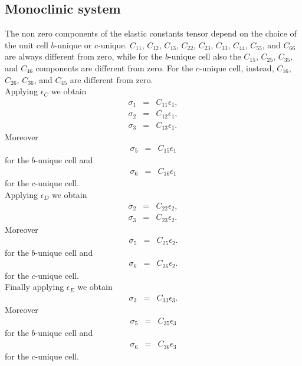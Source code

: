 \documentclass[12pt,a4paper]{article}
\begin{document}
\subsection{\color{web-blue}Monoclinic system}
The non zero components of the elastic constants tensor depend on the choice
of the unit cell $b$-unique or $c$-unique. 
$C_{11}$, $C_{12}$, $C_{13}$, $C_{22}$, $C_{23}$, $C_{33}$, $C_{44}$, 
$C_{55}$, and $C_{66}$ are always different from zero, while for the
$b$-unique cell also the $C_{15}$, $C_{25}$, $C_{35}$, and $C_{46}$ components
are different from zero. For the $c$-unique cell, instead, $C_{16}$, $C_{26}$, 
$C_{36}$, and $C_{45}$ are different from zero. \\
Applying $\epsilon_C$ we obtain
\begin{eqnarray}
\sigma_1&=&C_{11} \epsilon_1,  \\
\sigma_2&=&C_{12} \epsilon_1,  \\
\sigma_3&=&C_{13} \epsilon_1.  
\end{eqnarray}
Moreover
\begin{eqnarray}
\sigma_5&=&C_{15} \epsilon_1
\end{eqnarray}
for the $b$-unique cell and 
\begin{eqnarray}
\sigma_6&=&C_{16} \epsilon_1
\end{eqnarray}
for the $c$-unique cell. \\
Applying $\epsilon_D$ we obtain
\begin{eqnarray}
\sigma_2&=&C_{22} \epsilon_2,  \\
\sigma_3&=&C_{23} \epsilon_2.  
\end{eqnarray}
Moreover
\begin{eqnarray}
\sigma_5&=&C_{25} \epsilon_2.
\end{eqnarray}
for the $b$-unique cell and 
\begin{eqnarray}
\sigma_6&=&C_{26} \epsilon_2.
\end{eqnarray}
for the $c$-unique cell. \\
Finally applying $\epsilon_E$ we obtain
\begin{eqnarray}
\sigma_3&=&C_{33} \epsilon_3.
\end{eqnarray}
Moreover 
\begin{eqnarray}
\sigma_5&=&C_{35} \epsilon_3
\end{eqnarray}
for the $b$-unique cell and 
\begin{eqnarray}
\sigma_6&=&C_{36} \epsilon_3
\end{eqnarray}
for the $c$-unique cell. \\
\end{document}
